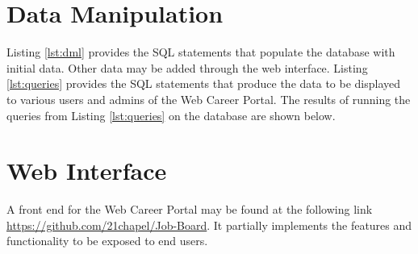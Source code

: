 \documentclass{article}
\begin{document}
    \section{Data Manipulation}
        Listing \ref{lst:dml} provides the SQL statements that populate the database with initial data. Other data may
        be added through the web interface.  Listing \ref{lst:queries} provides the SQL statements that produce the data
        to be displayed to various users and admins of the Web Career Portal.  The results of running
        the queries from Listing \ref{lst:queries} on the database are shown below. 
    \section{Web Interface}
        A front end for the Web Career Portal may be found at the following link
        \url{https://github.com/21chapel/Job-Board}. It partially implements the features and functionality to be
        exposed to end users.
\end{document}
